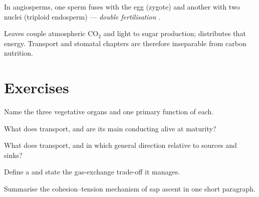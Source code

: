 \begin{proposition}\label{prop:g12:plant-biology:double}
In angiosperms, one sperm fuses with the egg (zygote) and another with
two  nuclei (triploid endosperm) --- \emph{double fertilisation}
.
\end{proposition}
\admitted

\begin{remark}\label{rem:g12:plant-biology:photo}
Leaves couple atmospheric CO$_2$ and light to sugar production; 
distributes that  energy. Transport and stomatal chapters are
therefore inseparable from carbon nutrition.
\end{remark}

\section{Exercises}

\begin{exercise}[$\star$]\label{exo:g12:plant-biology:1}
Name the three vegetative organs and one primary function of each.
\end{exercise}

\begin{exercise}[$\star$]\label{exo:g12:plant-biology:2}
What does  transport, and are its main conducting  alive at
maturity?
\end{exercise}

\begin{exercise}[$\star$]\label{exo:g12:plant-biology:3}
What does  transport, and in which general direction relative to
sources and sinks?
\end{exercise}

\begin{exercise}[$\star$]\label{exo:g12:plant-biology:4}
Define a  and state the gas-exchange trade-off it manages.
\end{exercise}

\begin{exercise}[$\star\star$]\label{exo:g12:plant-biology:5}
Summarise the cohesion--tension mechanism of sap ascent in one short
paragraph.
\end{exercise}

